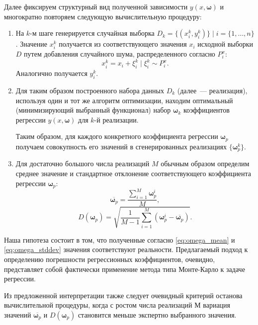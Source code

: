 \documentclass[11pt,a4paper]{article}
\theoremstyle{definition}
\begin{document}
Далее фиксируем структурный вид полученной зависимости $y(x, \boldsymbol{\omega})$ и
многократно повторяем следующую вычислительную процедуру:
\begin{enumerate}
  \item На $k$-м шаге генерируется случайная выборка
	$D_k = \{ (x_i^k, y_i^k) \} \mid i = \{ 1, \dots, n \}$. Значение $x_i^k$
	получается из соответствующего значения $x_i$ исходной
	выборки $D$ путем добавления случайного шума, распределенного согласно
	$P_i^x$:
	\[
	  x_i^k = x_i + \xi_i^k \mid \xi_i^k \sim P_i^x.
	\]
	Аналогично получается $y_i^k$.
  \item Для таким образом построенного набора данных $D_k$
	(далее~--- реализация), используя один и тот же
    алгоритм оптимизации, находим оптимальный (минимизирующий выбранный
	функционал) набор $\boldsymbol{\omega}_k$ коэффициентов регрессии
	$y(x, \boldsymbol{\omega})$ для $k$-й реализации.

	Таким образом, для каждого конкретного коэффициента регрессии
	$\boldsymbol{\omega}_p$ получаем совокупность его значений в сгенерированных реализациях
	$\{ \boldsymbol{\omega}_p^k \}$.
  \item Для достаточно большого числа реализаций $M$ обычным образом определим
	  среднее значение и стандартное отклонение соответствующего
	  коэффициента регрессии $\boldsymbol{\omega}_p$:
	  \begin{equation}
		\label{eq:omega_mean}
		\overline{\boldsymbol{\omega}_p} = \frac{\sum_{i = 1}^M \boldsymbol{\omega}_p^i}{M},
	  \end{equation}
	  \begin{equation}
		\label{eq:omega_stddev}
		D(\boldsymbol{\omega}_p) = \sqrt{\frac{1}{M - 1} \sum_{i = 1}^M (\boldsymbol{\omega}_p^i - \overline{\boldsymbol{\omega}_p})}.
	  \end{equation}
\end{enumerate}

Наша гипотеза состоит в том, что полученные согласно \eqref{eq:omega_mean} и \eqref{eq:omega_stddev}
значения соответствуют реальности. Предлагаемый подход к определению
погрешности регрессионных коэффициентов, очевидно, представляет собой
фактически применение метода типа Монте-Карло к задаче регрессии.

Из предложенной интерпретации также следует очевидный критерий
останова вычислительной процедуры, когда с ростом числа реализаций $М$
вариация значений $\overline{\boldsymbol{\omega}_p}$ и
$D(\boldsymbol{\omega}_p)$ становится меньше экспертно выбранного
значения.
\end{document}
